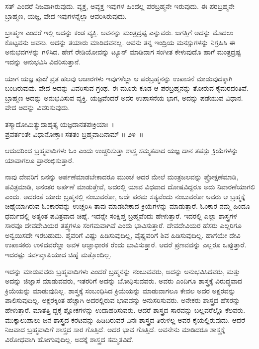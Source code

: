 ಸತ್ ಎಂದರೆ ನಿಜವಾಗಿರುವುದು. ವ್ಯಕ್ತ, ಅವ್ಯಕ್ತ ಇವುಗಳ ಹಿಂದೆಲ್ಲ ಪರಬ್ರಹ್ಮನೇ ಇರು\-ವುದು. ಈ ಪರಬ್ರಹ್ಮನೇ ಬ್ರಾಹ್ಮಣ, ಯಜ್ಞ, ವೇದ ಇವುಗಳನ್ನೆಲ್ಲಾ ಆವರಿಸಿರುವುದು.

\newpage

ಬ್ರಾಹ್ಮಣ ಎಂದರೆ ಇಲ್ಲಿ ಅದನ್ನು ಕಂಡ ವ್ಯಕ್ತಿ. ಅವನನ್ನು ಮಂತ್ರದ್ರಷ್ಟ ಎನ್ನುವರು. ಜಗತ್ತಿಗೆ ಅದನ್ನು ಮೊದಲು ಕೊಟ್ಟವನು ಅವನು. ಅದನ್ನು ತಯಾರು ಮಾಡಿದವನಲ್ಲ. ಅವನು ತನ್ನ ಇಂದ್ರಿಯ ಮನಸ್ಸುಗಳನ್ನು ನಿಗ್ರಹಿಸಿ ಈ ಅನುಭವಗಳನ್ನು ಗಳಿಸಿದ. ಹೇಗೆ ರೇಡಿಯೋವನ್ನು ಟ್ಯೂನ್ ಮಾಡಿದಾಗ ಸಂಗೀತ ಕೇಳುವುದೊ ಹಾಗೆ ಮಂತ್ರದ್ರಷ್ಟ ಇದನ್ನು ಅನುಭವಿಸಿ ವಿವರಿಸುತ್ತಾನೆ.

ಯಾಗ ಯಜ್ಞ ಪೂಜೆ ವ್ರತ ಹಲವು ಆಚಾರಗಳು ಇವುಗಳೆಲ್ಲಾ ಆ ಪರಬ್ರಹ್ಮನನ್ನು ಉಪಾಸನೆ ಮಾಡುವುದಕ್ಕಾಗಿ ಬಂದಿರುವುವು. ವೇದ ಅದನ್ನು ವಿವರಿಸುವ ಗ್ರಂಥ. ಈ ಮೂರು ಕೂಡ ಆ ಪರಬ್ರಹ್ಮನನ್ನು ತೋರುವ ಕೈಮರದಂತಿವೆ. ಬ್ರಾಹ್ಮಣ ಅದನ್ನು ಅನುಭವಿಸುವ ವ್ಯಕ್ತಿ. ಯಜ್ಞವೆಂದರೆ ಅದರ ಉಪಾಸನೆಯ ಭಾಗ, ಅದನ್ನು ಪಡೆಯುವ ವಿಧಾನ. ವೇದ ಅದನ್ನು ವಿವರಿಸುವುದು.

\begin{shloka}
ತಸ್ಮಾದೋಮಿತ್ಯುದಾಹೃತ್ಯ ಯಜ್ಞದಾನತಪಃಕ್ರಿಯಾಃ~।\\ಪ್ರವರ್ತಂತೇ ವಿಧಾನೋಕ್ತಾಃ ಸತತಂ ಬ್ರಹ್ಮವಾದಿನಾಮ್ \hfill॥ ೨೪~॥
\end{shloka}

\begin{artha}
ಆದುದರಿಂದ ಬ್ರಹ್ಮವಾದಿಗಳು ಓಂ ಎಂದು ಉಚ್ಚರಿಸುತ್ತಾ ಶಾಸ್ತ್ರ ಸಮ್ಮತವಾದ ಯಜ್ಞ ದಾನ ತಪಸ್ಸು ಕ್ರಿಯೆಗಳನ್ನು ಯಾವಾಗಲೂ ಪ್ರಾರಂಭಿಸುತ್ತಾರೆ.
\end{artha}

ನಾವು ದೇವರಿಗೆ ಏನನ್ನು ಅರ್ಪಣೆಮಾಡಬೇಕಾದರೂ ಮುಂಚೆ ಅದರ ಮೇಲೆ ಮಂತ್ರಜಲವನ್ನು ಪ್ರೋಕ್ಷಣೆಮಾಡಿ, ಪವಿತ್ರಮಾಡಿ, ಅನಂತರ ಅರ್ಪಣೆ ಮಾಡುತ್ತೇವೆ, ಅದರಲ್ಲಿ ಯಾವ ವಿಧವಾದ ದೋಷವಿದ್ದರೂ ಅದು ನಿವಾರಣೆಯಾಗಲಿ ಎಂದು. ಅದರಂತೆ ಯಾರು ಬ್ರಹ್ಮನಲ್ಲಿ ನಂಬುವರೋ, ಅದೇ ಪರಮ ಸತ್ಯವೆಂದು ನಂಬುವರೋ ಅವರು ಆ ಬ್ರಹ್ಮಕ್ಕೆ ಚಿಹ್ನೆಯಾಗಿರುವ ಓಂಕಾರವನ್ನು ಉಚ್ಚರಿಸಿ ತಾವು ಮಾಡಬೇಕಾದ ಕ್ರಿಯೆಗಳನ್ನು ಮಾಡುತ್ತಾರೆ. ಓಂಕಾರ ನಮ್ಮ ಹಿಂದೂ ಧರ್ಮದಲ್ಲಿ ಅತ್ಯಂತ ಪವಿತ್ರವಾದ ಚಿಹ್ನೆ. ಇದನ್ನೇ ಸಂಕ್ಷಿಪ್ತ ಬ್ರಹ್ಮವೆಂದು ಹೇಳುತ್ತಾರೆ. ಇದರಲ್ಲಿ ಎಲ್ಲಾ ಶಾಸ್ತ್ರಗಳ ಸಾರವೂ ದೇವದೇವಿಯರ ತತ್ತ್ವಗಳೂ ಸಂಗಮವಾಗಿವೆ ಎಂದು ಭಾವಿಸುತ್ತಾರೆ. ದೇವದೇವಿಯರ ಹೆಸರು ಎಲ್ಲರಿಗೂ ಅನ್ವಯಿಸದೇ ಇರಬಹುದು. ಶೈವರಿಗೆ ವಿಷ್ಣು ಹಿಡಿಸುವುದಿಲ್ಲ, ವೈಷ್ಣವರಿಗೆ ಶಿವ ಹಿಡಿಸುವುದಿಲ್ಲ. ಹಾಗೆಯೇ ದೇವಿ ಉಪಾಸಕರು ಉಳಿದವರೆಲ್ಲಾ ಅವಳ ಆಜ್ಞಾಧಾರಕ ರೆಂದು ಭಾವಿಸುತ್ತಾರೆ. ಆದರೆ ಪ್ರಣವವನ್ನು ಎಲ್ಲರೂ ಒಪ್ಪುತ್ತಾರೆ. ಇದರಷ್ಟು ಸರ್ವವ್ಯಾಪಿಯಾದ ಚಿಹ್ನೆ ಮತ್ತೊಂದಿಲ್ಲ. 

ಇದನ್ನು ಮಾಡುವವರು ಬ್ರಹ್ಮವಾದಿಗಳು ಎಂದರೆ ಬ್ರಹ್ಮನನ್ನು ನಂಬುವವರು, ಅದನ್ನು ಅನುಭವಿಸಿದವರು, ಮತ್ತು ಅದನ್ನು ಜಿಜ್ಞಾಸೆ ಮಾಡುವವರು, ಇತರರಿಗೆ ಅದನ್ನು ಬೋಧಿಸುವವರು. ಅವರು ಎಂದಿಗೂ ಶಾಸ್ತ್ರಕ್ಕೆ ವಿರುದ್ಧವಾದ ಕ್ರಿಯೆಯನ್ನು ಮಾಡುವುದಿಲ್ಲ. ಶಾಸ್ತ್ರಕ್ಕೆ ಸಂಬಂಧಿಸಿದ ಕ್ರಿಯೆಯನ್ನು ಮಾಡುವಾಗಲೂ ಕೇವಲ ಅದರ ಅಕ್ಷರವನ್ನು ಪಾಲಿಸುವುದಿಲ್ಲ. ಅಕ್ಷರಕ್ಕಿಂತ ಹೆಚ್ಚಾಗಿ ಅದರಲ್ಲಿರುವ ಭಾವವನ್ನು ಅನುಸರಿಸುವರು. ಅನೇಕರು ಶಾಸ್ತ್ರದ ಹೆಸರನ್ನು ಹೇಳುತ್ತಾರೆ. ಮಾತೆತ್ತಿ ದ್ದಕ್ಕೆ ಶ್ಲೋಕಗಳನ್ನು ಉದಾಹರಿಸುವರು. ಆದರೆ ಶಾಸ್ತ್ರದ ಸಾರವನ್ನು ಬಲ್ಲವರೆಲ್ಲೊ ಕೆಲವರು. ಮುಕ್ಕಾಲುಪಾಲು ಜನ ಶಾಸ್ತ್ರದ ಕರಟವನ್ನು ಹಿಡಿದಿರುವರೆ ವಿನಃ ಶಾಸ್ತ್ರದ ತಿರುಳಲ್ಲ ಅವರ ಕೈಯಲ್ಲಿರುವುದು. ಆದರೆ ನಿಜವಾದ ಬ್ರಹ್ಮವಾದಿಗೆ ಶಾಸ್ತ್ರದ ಸಾರ ಗೊತ್ತಿದೆ. ಅದರ ಭಾವ ಗೊತ್ತಿದೆ. ಅವನೇನು ಮಾಡಿದರೂ ಶಾಸ್ತ್ರಕ್ಕೆ ವಿರೋಧವಾಗಿ ಹೋಗುವುದಿಲ್ಲ. ಅದಕ್ಕೆ ಶಾಸ್ತ್ರದ ಸಮ್ಮತವಿದೆ.

